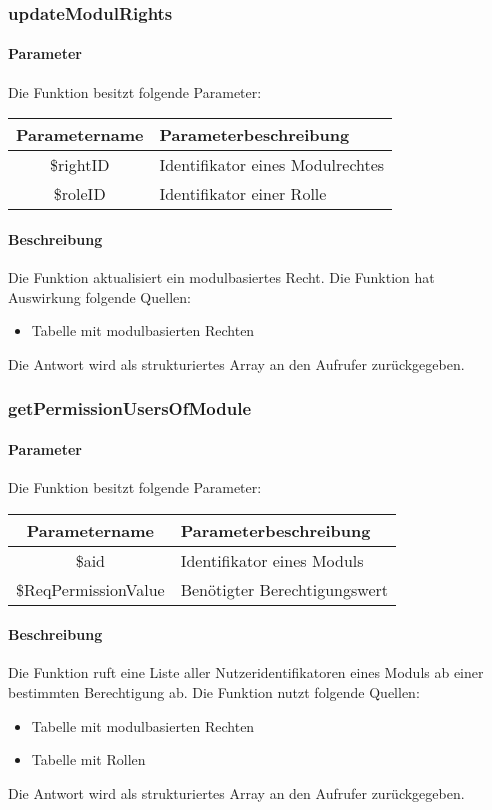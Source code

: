 \subsubsection{updateModulRights}
\paragraph{Parameter} Die Funktion besitzt folgende Parameter:
\begin{table}[H]
	\begin{tabular}{|c|p{11cm}|}
		\hline
		\textbf{Parametername} & \textbf{Parameterbeschreibung} \\ \hline
		\$rightID & Identifikator eines Modulrechtes \\ \hline
		\$roleID  & Identifikator einer Rolle \\ \hline
	\end{tabular}
\end{table}
\paragraph{Beschreibung} Die Funktion aktualisiert ein modulbasiertes Recht. Die Funktion hat Auswirkung folgende Quellen:
\begin{itemize}
	\item Tabelle mit modulbasierten Rechten
\end{itemize}
Die Antwort wird als strukturiertes Array an den Aufrufer zurückgegeben.
\subsubsection{getPermissionUsersOfModule}
\paragraph{Parameter} Die Funktion besitzt folgende Parameter:
\begin{table}[H]
	\begin{tabular}{|c|p{11cm}|}
		\hline
		\textbf{Parametername} & \textbf{Parameterbeschreibung} \\ \hline
		\$aid                & Identifikator eines Moduls \\ \hline
		\$ReqPermissionValue & Benötigter Berechtigungswert \\ \hline
	\end{tabular}
\end{table}
\paragraph{Beschreibung} Die Funktion ruft eine Liste aller Nutzeridentifikatoren eines Moduls ab einer bestimmten Berechtigung ab. Die Funktion nutzt folgende Quellen:
\begin{itemize}
	\item Tabelle mit modulbasierten Rechten
	\item Tabelle mit Rollen
\end{itemize}
Die Antwort wird als strukturiertes Array an den Aufrufer zurückgegeben.
